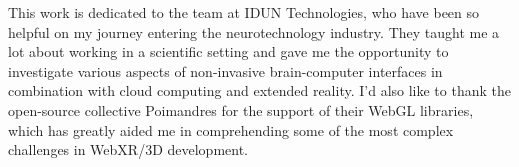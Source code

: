 \begin{dedication}

	This work is dedicated to the team at IDUN Technologies, who have been so helpful on my journey entering the neurotechnology industry. They taught me a lot about working in a scientific setting and gave me the opportunity to investigate various aspects of non-invasive brain-computer interfaces in combination with cloud computing and extended reality. I'd also like to thank the open-source collective Poimandres for the support of their WebGL libraries, which has greatly aided me in comprehending some of the most complex challenges in WebXR/3D development.

\end{dedication}